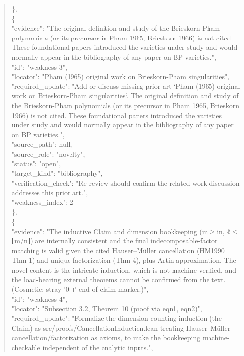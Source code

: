 \documentclass[11pt]{article}
\begin{document}
\begin{quote}
    \},\\
    \{\\
      "evidence": "The original definition and study of the Brieskorn-Pham polynomials (or its precursor in Pham 1965, Brieskorn 1966) is not cited. These foundational papers introduced the varieties under study and would normally appear in the bibliography of any paper on BP varieties.",\\
      "id": "weakness-3",\\
      "locator": "Pham (1965) original work on Brieskorn-Pham singularities",\\
      "required\_update": "Add or discuss missing prior art `Pham (1965) original work on Brieskorn-Pham singularities`. The original definition and study of the Brieskorn-Pham polynomials (or its precursor in Pham 1965, Brieskorn 1966) is not cited. These foundational papers introduced the varieties under study and would normally appear in the bibliography of any paper on BP varieties.",\\
      "source\_path": null,\\
      "source\_role": "novelty",\\
      "status": "open",\\
      "target\_kind": "bibliography",\\
      "verification\_check": "Re-review should confirm the related-work discussion addresses this prior art.",\\
      "weakness\_index": 2\\
    \},\\
    \{\\
      "evidence": "The inductive Claim and dimension bookkeeping (m\ensuremath{\ge}in, ℓ\ensuremath{\le}⌊m/n⌋) are internally consistent and the final indecomposable-factor matching is valid given the cited Hauser--Müller cancellation (HM1990 Thm 1) and unique factorization (Thm 4), plus Artin approximation. The novel content is the intricate induction, which is not machine-verified, and the load-bearing external theorems cannot be confirmed from the text. (Cosmetic: stray '0◻' end-of-claim marker.)",\\
      "id": "weakness-4",\\
      "locator": "Subsection 3.2, Theorem 10 (proof via eqn1, eqn2)",\\
      "required\_update": "Formalize the dimension-counting induction (the Claim) as src/proofs/CancellationInduction.lean treating Hauser--Müller cancellation/factorization as axioms, to make the bookkeeping machine-checkable independent of the analytic inputs.",\\

\end{quote}
\end{document}

